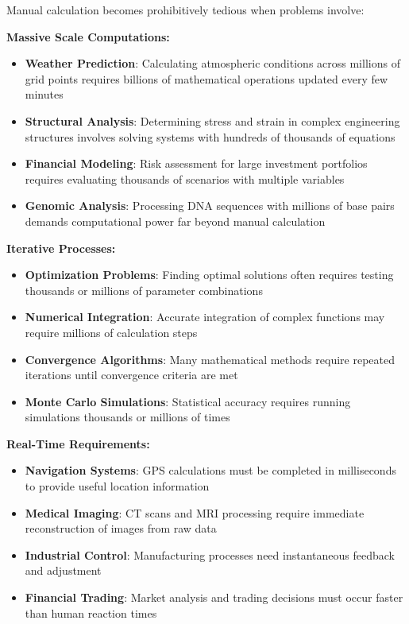 Manual calculation becomes prohibitively tedious when problems involve:

\textbf{Massive Scale Computations:}
\begin{itemize}
    \item \textbf{Weather Prediction}: Calculating atmospheric conditions across millions of grid points requires billions of mathematical operations updated every few minutes
    \item \textbf{Structural Analysis}: Determining stress and strain in complex engineering structures involves solving systems with hundreds of thousands of equations
    \item \textbf{Financial Modeling}: Risk assessment for large investment portfolios requires evaluating thousands of scenarios with multiple variables
    \item \textbf{Genomic Analysis}: Processing DNA sequences with millions of base pairs demands computational power far beyond manual calculation
\end{itemize}

\textbf{Iterative Processes:}
\begin{itemize}
    \item \textbf{Optimization Problems}: Finding optimal solutions often requires testing thousands or millions of parameter combinations
    \item \textbf{Numerical Integration}: Accurate integration of complex functions may require millions of calculation steps
    \item \textbf{Convergence Algorithms}: Many mathematical methods require repeated iterations until convergence criteria are met
    \item \textbf{Monte Carlo Simulations}: Statistical accuracy requires running simulations thousands or millions of times
\end{itemize}

\textbf{Real-Time Requirements:}
\begin{itemize}
    \item \textbf{Navigation Systems}: GPS calculations must be completed in milliseconds to provide useful location information
    \item \textbf{Medical Imaging}: CT scans and MRI processing require immediate reconstruction of images from raw data
    \item \textbf{Industrial Control}: Manufacturing processes need instantaneous feedback and adjustment
    \item \textbf{Financial Trading}: Market analysis and trading decisions must occur faster than human reaction times
\end{itemize}

